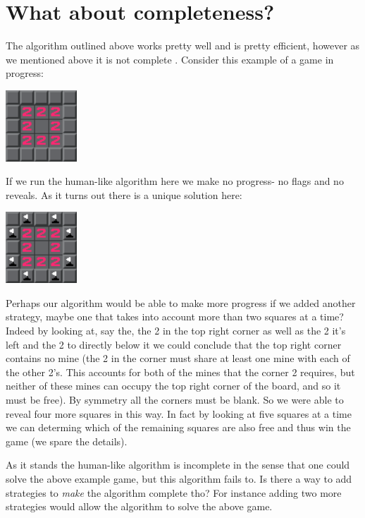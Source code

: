 \documentclass{article}
\theoremstyle{definition}
\theoremstyle{definition}
\theoremstyle{theorem}
\begin{document}
	\section{What about completeness?}\label{whatabout}
	The algorithm outlined above works pretty well and is pretty efficient, however as we mentioned above it is not complete . Consider this example of a game in progress:
	\begin{center}
		\includegraphics[width=0.2\textwidth]{exampleimages/example3a}
	\end{center}
	If we run the human-like algorithm here we make no progress- no flags and no reveals. As it turns out there is a unique solution here:
	\begin{center}
		\includegraphics[width=0.2\textwidth]{exampleimages/example3b}
	\end{center}
	Perhaps our algorithm would be able to make more progress if we added another strategy, maybe one that takes into account more than two squares at a time? Indeed by looking at, say the, the 2 in the top right corner as well as the 2 it's left and the 2 to directly below it we could conclude that the top right corner contains no mine (the 2 in the corner must share at least one mine with each of the other 2's. This accounts for both of the mines that the corner 2 requires, but neither of these mines can occupy the top right corner of the board, and so it must be free). By symmetry all the corners must be blank. So we were able to reveal four more squares in this way. In fact by looking at five squares at a time we can determing which of the remaining squares are also free and thus win the game (we spare the details).
	
	As it stands the human-like algorithm is incomplete in the sense that one could solve the above example game, but this algorithm fails to. Is there a way to add strategies to \textit{make} the algorithm complete tho? For instance adding two more strategies would allow the algorithm to solve the above game. 
	
\end{document}
